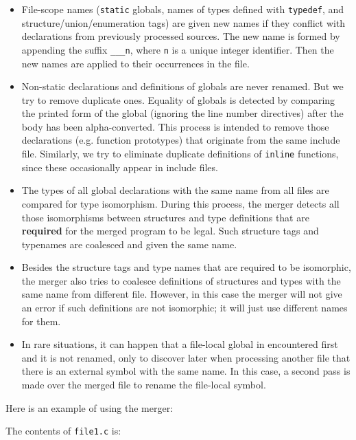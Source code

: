 \documentclass{article}
\def\t#1{{\tt #1}}
\begin{document}
\begin{itemize}
\item File-scope names (\t{static} globals, names of types defined with
\t{typedef}, and structure/union/enumeration tags) are given new names if they
conflict with declarations from previously processed sources. The new name is
formed by appending the suffix \t{\_\_\_n}, where \t{n} is a unique integer
identifier. Then the new names are applied to their occurrences in the file. 

\item Non-static declarations and definitions of globals are never renamed.
But we try to remove duplicate ones. Equality of globals is detected by
comparing the printed form of the global (ignoring the line number directives)
after the body has been alpha-converted. This process is intended to remove
those declarations (e.g. function prototypes) that originate from the same
include file. Similarly, we try to eliminate duplicate definitions of
\t{inline} functions, since these occasionally appear in include files.

\item The types of all global declarations with the same name from all files
are compared for type isomorphism. During this process, the merger detects all
those isomorphisms between structures and type definitions that are {\bf
required} for the merged program to be legal. Such structure tags and
typenames are coalesced and given the same name. 

\item Besides the structure tags and type names that are required to be
isomorphic, the merger also tries to coalesce definitions of structures and
types with the same name from different file. However, in this case the merger
will not give an error if such definitions are not isomorphic; it will just
use different names for them. 

\item In rare situations, it can happen that a file-local global in
encountered first and it is not renamed, only to discover later when
processing another file that there is an external symbol with the same name.
In this case, a second pass is made over the merged file to rename the
file-local symbol. 
\end{itemize}

 Here is an example of using the merger:

 The contents of \t{file1.c} is:
\end{document}
